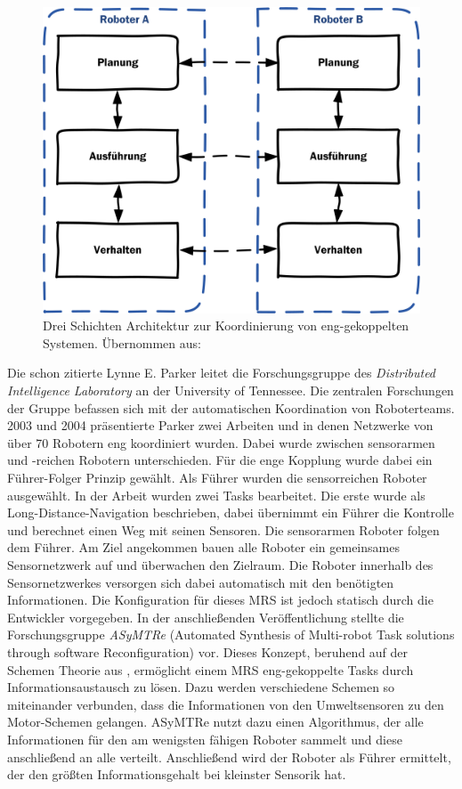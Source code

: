 \begin{figure}[H]
	\centering
	\includegraphics[scale=0.6]{fig/layer}   
	\caption[Three-Layer Architektur]{Drei Schichten Architektur zur Koordinierung von eng-gekoppelten Systemen. Übernommen aus: \cite{simmons2002layered}}
	\label{fig:sota-layer}
\end{figure}

Die schon zitierte Lynne E. Parker leitet die Forschungsgruppe des \textit{Distributed Intelligence Laboratory} an der University of Tennessee. Die zentralen Forschungen der Gruppe befassen sich mit der automatischen Koordination von Roboterteams. 2003 und 2004 präsentierte Parker zwei Arbeiten \cite{parker2003effect} und \cite{parker2004tightly} in denen Netzwerke von über 70 Robotern eng koordiniert wurden. Dabei wurde zwischen sensorarmen und -reichen Robotern unterschieden. Für die enge Kopplung wurde dabei ein Führer-Folger Prinzip gewählt. Als Führer wurden die sensorreichen Roboter ausgewählt. In der Arbeit wurden zwei Tasks bearbeitet. Die erste wurde als Long-Distance-Navigation beschrieben, dabei übernimmt ein Führer die Kontrolle und berechnet einen Weg mit seinen Sensoren. Die sensorarmen Roboter folgen dem Führer. Am Ziel angekommen bauen alle Roboter ein gemeinsames Sensornetzwerk auf und überwachen den Zielraum. Die Roboter innerhalb des Sensornetzwerkes versorgen sich dabei automatisch mit den benötigten Informationen. Die Konfiguration für dieses MRS ist jedoch statisch durch die Entwickler vorgegeben. In der anschließenden Veröffentlichung \cite{parker2005enabling} stellte die Forschungsgruppe \textit{ASyMTRe} (Automated Synthesis of Multi-robot Task solutions through software Reconfiguration) vor. Dieses Konzept, beruhend auf der Schemen Theorie aus \cite{arkin1987motor}, ermöglicht einem MRS eng-gekoppelte Tasks durch Informationsaustausch zu lösen. Dazu werden verschiedene Schemen so miteinander verbunden, dass die Informationen von den Umweltsensoren zu den Motor-Schemen gelangen. ASyMTRe nutzt dazu einen Algorithmus, der alle Informationen für den am wenigsten fähigen Roboter sammelt und diese anschließend an alle verteilt. Anschließend wird der Roboter als Führer ermittelt, der den größten Informationsgehalt bei kleinster Sensorik hat.\cite{lundh2006plan} 

